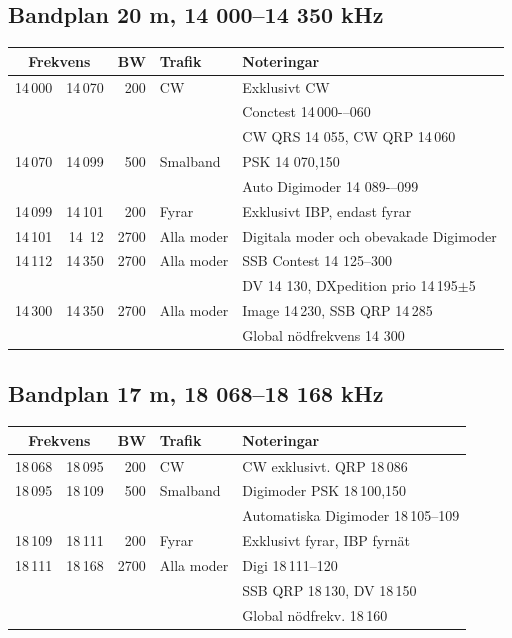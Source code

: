 \subsection*{Bandplan 20 m, 14 000--14 350 kHz}
\begin{tabular}{rrrll}
\multicolumn{2}{c}{\textbf{Frekvens}} & \textbf{BW} & \textbf{Trafik} & \textbf{Noteringar} \\ \hline
14\,000 & 14\,070 & 200  & CW         & Exklusivt CW                             \\
        &         &      &            & Conctest 14\,000-–060                    \\
        &         &      &            & CW QRS 14 055, CW QRP 14\,060            \\ \hline
14\,070 & 14\,099 & 500  & Smalband   & PSK 14 070,150                           \\
        &         &      &            & Auto Digimoder 14 089-–099               \\ \hline
14\,099 & 14\,101 & 200  & Fyrar      & Exklusivt IBP, endast fyrar              \\ \hline
14\,101 & 14 \,12 & 2700 & Alla moder & Digitala moder och obevakade Digimoder   \\ \hline
14\,112 & 14\,350 & 2700 & Alla moder & SSB Contest 14 125--300                  \\
        &         &      &            & DV 14 130, DXpedition prio 14\,195$\pm$5 \\ \hline
14\,300 & 14\,350 & 2700 & Alla moder & Image 14\,230, SSB QRP 14\,285           \\
        &         &      &            & Global nödfrekvens 14 300                \\ \hline
\end{tabular}

\subsection*{Bandplan 17 m, 18 068--18 168 kHz}
\begin{tabular}{rrrll}
\multicolumn{2}{c}{\textbf{Frekvens}} & \textbf{BW} & \textbf{Trafik} & \textbf{Noteringar} \\ \hline

18\,068 & 18\,095 & 200  & CW         & CW exklusivt. QRP 18\,086             \\ \hline
18\,095 & 18\,109 & 500  & Smalband   & Digimoder PSK 18\,100,150             \\
        &         &      &            & Automatiska Digimoder 18\,105--109 \\ \hline
18\,109 & 18\,111 & 200  & Fyrar      & Exklusivt fyrar, IBP fyrnät           \\ \hline
18\,111 & 18\,168 & 2700 & Alla moder & Digi 18\,111--120                   \\
        &         &      &            & SSB QRP 18\,130, DV 18\,150           \\
        &         &      &            & Global nödfrekv. 18\,160              \\ \hline
\end{tabular}

